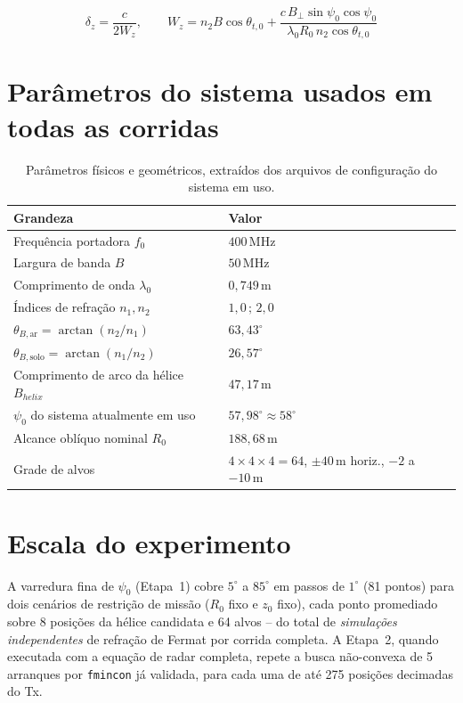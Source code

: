 \documentclass[12pt,a4paper,oneside]{book}
\theoremstyle{definition}
\theoremstyle{remark}
\newcommand{\thetaBar}{\theta_{B,\mathrm{ar}}}
\newcommand{\thetaBsolo}{\theta_{B,\mathrm{solo}}}
\newcommand{\nuno}{n_1}
\newcommand{\ndos}{n_2}
\newcommand{\dz}{\delta_z}
\begin{document}
\begin{equation}
  \dz = \frac{c}{2W_z}, \qquad
  W_z = \ndos B\cos\theta_{t,0} + \frac{c\,B_\perp\sin\psi_0\cos\psi_0}{\lambda_0 R_0\,\ndos\cos\theta_{t,0}}
  \label{eq:Wz_verif}
\end{equation}

\section{Parâmetros do sistema usados em todas as corridas}

\begin{table}[H]
\centering
\caption{Parâmetros físicos e geométricos, extraídos dos arquivos de
configuração do sistema em uso.}
\begin{tabular}{ll}
\toprule
Grandeza & Valor \\
\midrule
Frequência portadora $f_0$ & $400\,\mathrm{MHz}$ \\
Largura de banda $B$ & $50\,\mathrm{MHz}$ \\
Comprimento de onda $\lambda_0$ & $0{,}749\,\mathrm{m}$ \\
Índices de refração $\nuno,\ndos$ & $1{,}0\,;\,2{,}0$ \\
$\thetaBar=\arctan(\ndos/\nuno)$ & $63{,}43^\circ$ \\
$\thetaBsolo=\arctan(\nuno/\ndos)$ & $26{,}57^\circ$ \\
Comprimento de arco da hélice $B_{helix}$ & $47{,}17\,\mathrm{m}$ \\
$\psi_0$ do sistema atualmente em uso & $57{,}98^\circ\approx58^\circ$ \\
Alcance oblíquo nominal $R_0$ & $188{,}68\,\mathrm{m}$ \\
Grade de alvos & $4\times4\times4=64$, $\pm40\,\mathrm{m}$ horiz., $-2$ a $-10\,\mathrm{m}$ \\
\bottomrule
\end{tabular}
\end{table}

\section{Escala do experimento}

A varredura fina de $\psi_0$ (Etapa~1) cobre $5^\circ$ a $85^\circ$ em
passos de $1^\circ$ (81 pontos) para dois cenários de restrição de missão
($R_0$ fixo e $z_0$ fixo), cada ponto promediado sobre 8 posições da hélice
candidata e 64 alvos -- do total de \emph{simulações independentes} de
refração de Fermat por corrida completa. A Etapa~2, quando executada com a
equação de radar completa, repete a busca não-convexa de 5 arranques por
\texttt{fmincon} já validada, para cada uma de até 275 posições decimadas
do Tx.
\end{document}
